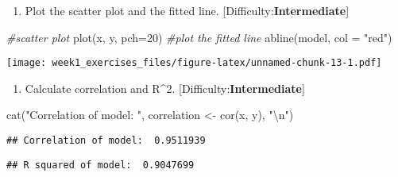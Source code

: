 \documentclass[
]{article}
\newenvironment{Shaded}{\begin{snugshade}}{\end{snugshade}}
\newcommand{\AttributeTok}[1]{\textcolor[rgb]{0.77,0.63,0.00}{#1}}
\newcommand{\CommentTok}[1]{\textcolor[rgb]{0.56,0.35,0.01}{\textit{#1}}}
\newcommand{\DecValTok}[1]{\textcolor[rgb]{0.00,0.00,0.81}{#1}}
\newcommand{\FunctionTok}[1]{\textcolor[rgb]{0.00,0.00,0.00}{#1}}
\newcommand{\NormalTok}[1]{#1}
\newcommand{\OtherTok}[1]{\textcolor[rgb]{0.56,0.35,0.01}{#1}}
\newcommand{\SpecialCharTok}[1]{\textcolor[rgb]{0.00,0.00,0.00}{#1}}
\newcommand{\StringTok}[1]{\textcolor[rgb]{0.31,0.60,0.02}{#1}}
\providecommand{\tightlist}{%
  \setlength{\itemsep}{0pt}\setlength{\parskip}{0pt}}
\begin{document}
\begin{enumerate}
\def\labelenumi{\arabic{enumi}.}
\setcounter{enumi}{1}
\tightlist
\item
  Plot the scatter plot and the fitted line.
  {[}Difficulty:\textbf{Intermediate}{]}
\end{enumerate}

\begin{Shaded}
\begin{Highlighting}[]
\CommentTok{\#scatter plot}
\FunctionTok{plot}\NormalTok{(x, y, }\AttributeTok{pch=}\DecValTok{20}\NormalTok{)}
\CommentTok{\#plot the fitted line}
\FunctionTok{abline}\NormalTok{(model, }\AttributeTok{col =} \StringTok{"red"}\NormalTok{)}
\end{Highlighting}
\end{Shaded}

\texttt{[image: week1\_exercises\_files/figure-latex/unnamed-chunk-13-1.pdf]}

\begin{enumerate}
\def\labelenumi{\arabic{enumi}.}
\setcounter{enumi}{2}
\tightlist
\item
  Calculate correlation and R\^{}2.
  {[}Difficulty:\textbf{Intermediate}{]}
\end{enumerate}

\begin{Shaded}
\begin{Highlighting}[]
\FunctionTok{cat}\NormalTok{(}\StringTok{"Correlation of model: "}\NormalTok{, correlation }\OtherTok{\textless{}{-}} \FunctionTok{cor}\NormalTok{(x, y), }\StringTok{"}\SpecialCharTok{\textbackslash{}n}\StringTok{"}\NormalTok{)}
\end{Highlighting}
\end{Shaded}

\begin{verbatim}
## Correlation of model:  0.9511939
\end{verbatim}

\begin{Shaded}
\end{Shaded}

\begin{verbatim}
## R squared of model:  0.9047699
\end{verbatim}
\end{document}
